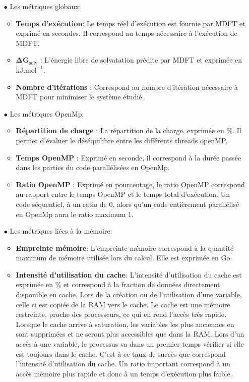 \begin{itemize}
\item[$\bullet$] Les métriques globaux:
  \begin{itemize}
    \item \textbf{Temps d’exécution}: Le temps réel d'exécution est fournie par MDFT et exprimé en secondes. Il correspond au temps nécessaire à l'exécution de MDFT.
    \item $\mathbf{\Delta G_{\mathrm{solv}}}$ : L’énergie libre de solvatation prédite par MDFT et exprimée en $\mathrm{kJ.mol}^{-1}$.
    \item \textbf{Nombre d'itérations} : Correspond au nombre d'itération nécessaire à MDFT pour minimiser le système étudié.
  \end{itemize}
  \vspace*{1.5ex}%

\item[$\bullet$] Les métriques OpenMp:
  \begin{itemize}
  \item \textbf{Répartition de charge} : La répartition de la charge, exprimée en \%. Il permet d'évaluer le déséquilibre entre les différents threads openMP.
  \item \textbf{Temps OpenMP} : Exprimé en seconde, il correspond à la durée passée dans les parties du code parallélisées en OpenMp.
  \item \textbf{Ratio OpenMP} : Exprimé en pourcentage, le ratio OpenMP correspond au rapport entre le temps OpenMP et le temps total d'exécution. Un code séquentiel, à un ratio de 0, alors qu'un code entièrement parallélisé en OpenMp aura le ratio maximum 1. 
  \end{itemize}
  \vspace*{1.5ex}%

\item[$\bullet$] Les métriques liées à la mémoire:
  \begin{itemize}
  \item \textbf{Empreinte mémoire}: L'empreinte mémoire correspond à la quantité maximum de mémoire utilisée lors du calcul. Elle est exprimée en Go.
  \item \textbf{Intensité d'utilisation du cache}: L'intensité d'utilisation du cache est exprimée en \% et correspond à la fraction de données directement disponible en cache. Lors de la création ou de l'utilisation d'une variable, celle ci est copiée de la RAM vers le cache. Le cache est une mémoire restreinte, proche des processeurs, ce qui en rend l'accès très rapide. Lorsque le cache arrive à saturation, les variables les plus anciennes en sont supprimées et ne seront plus accessibles que dans la RAM. Lors d'un accès à une variable, le processus va dans un premier temps vérifier si elle est toujours dans le cache. C'est à ce taux de succès que correspond l'intensité d'utilisation du cache. Un ratio important correspond à un accès mémoire plus rapide et donc à un temps d'exécution plus faible.
  \end{itemize}
  \vspace*{1.5ex}%


\end{itemize}
